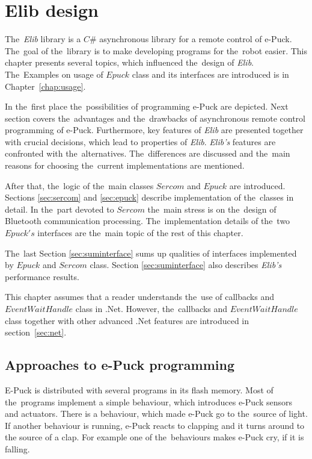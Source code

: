 \chapter{Elib design} \label{chap:elib}
  The~{\it Elib} library is a $C\#$ asynchronous library for a remote control of e-Puck. 
  The~goal of the~library is to make developing programs for the~robot easier.
  This chapter presents several topics, which influenced the~design of {\it Elib}.
  The~Examples on usage of $Epuck$ class and its interfaces are introduced is in Chapter~\ref{chap:usage}.

  In the~first place the~possibilities of programming e-Puck are depicted.
  Next section covers the~advantages and the~drawbacks of asynchronous remote control programming of e-Puck.
  Furthermore, key features of {\it Elib} are presented together with crucial decisions, which
  lead to properties of {\it Elib}. 
  {\it Elib's} features are confronted with the~alternatives. The~differences are discussed
  and the~main reasons for choosing the~current implementations are mentioned.

  After that, the~logic of the~main classes $Sercom$ and $Epuck$ are introduced. Sections 
  \ref{sec:sercom} and \ref{sec:epuck} describe implementation of the~classes in detail. 
  In the~part devoted to $Sercom$ the~main stress is on the~design of Bluetooth communication processing.
  The~implementation details of the~two $Epuck's$ interfaces are the~main topic of the rest of this chapter. 

  The~last Section \ref{sec:suminterface} sums up qualities of interfaces 
  implemented by $Epuck$ and $Sercom$ class.
  Section \ref{sec:suminterface} also describes {\it Elib's} performance results.

  This chapter assumes that a reader understands the~use of callbacks and $EventWaitHandle$ class in .Net.
  However, the~callbacks and $EventWaitHandle$ class together with other advanced .Net features 
  are introduced in section~\ref{sec:net}.

\section{Approaches to e-Puck programming} \label{sec:approach}
  E-Puck is distributed with several programs in its flash memory. 
  Most of the~programs implement a simple behaviour, which introduces e-Puck sensors and actuators.
  There is a behaviour, which made e-Puck go to the~source of light.
  If another behaviour is running, e-Puck
  reacts to clapping and it turns around to the source of a clap. For example one of the~behaviours makes
  e-Puck cry, if it is falling.
   
